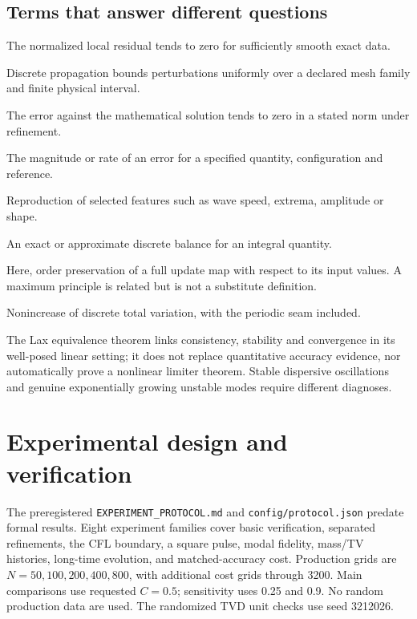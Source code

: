 \subsection{Terms that answer different questions}
\begin{description}[style=nextline]
\item[Consistency] The normalized local residual tends to zero for sufficiently smooth exact data.
\item[Stability] Discrete propagation bounds perturbations uniformly over a declared mesh family and finite physical interval.
\item[Convergence] The error against the mathematical solution tends to zero in a stated norm under refinement.
\item[Accuracy] The magnitude or rate of an error for a specified quantity, configuration and reference.
\item[Numerical fidelity] Reproduction of selected features such as wave speed, extrema, amplitude or shape.
\item[Conservation] An exact or approximate discrete balance for an integral quantity.
\item[Monotonicity] Here, order preservation of a full update map with respect to its input values. A maximum principle is related but is not a substitute definition.
\item[TVD] Nonincrease of discrete total variation, with the periodic seam included.
\end{description}
The Lax equivalence theorem links consistency, stability and convergence in its well-posed linear setting; it does not replace quantitative accuracy evidence, nor automatically prove a nonlinear limiter theorem. Stable dispersive oscillations and genuine exponentially growing unstable modes require different diagnoses.

\section{Experimental design and verification}
\label{sec:design}
The preregistered \texttt{EXPERIMENT\_PROTOCOL.md} and \texttt{config/protocol.json} predate formal results. Eight experiment families cover basic verification, separated refinements, the CFL boundary, a square pulse, modal fidelity, mass/TV histories, long-time evolution, and matched-accuracy cost. Production grids are $N=50,100,200,400,800$, with additional cost grids through 3200. Main comparisons use requested $C=0.5$; sensitivity uses 0.25 and 0.9. No random production data are used. The randomized TVD unit checks use seed 3212026.

